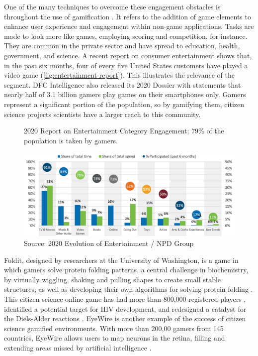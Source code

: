 One of the many techniques to overcome these engagement obstacles is throughout the use of gamification \cite{bowser2013using}. It refers to the addition of game elements to enhance user experience and engagement within non-game applications. Tasks are made to look more like games, employing scoring and competition, for instance. They are common in the private sector and have spread to education, health, government, and science. A recent report on consumer entertainment shows that, in the past six months, four of every five United States customers have played a video game (\autoref{fig:entertainment-report}). This illustrates the relevance of the segment. DFC Intelligence also released its 2020 Dossier with statements that nearly half of 3.1 billion gamers play games on their smartphones only. Gamers represent a significant portion of the population, so by gamifying them, citizen science projects scientists have a larger reach to this community.

\begin{figure}[h]
    \centering
    \caption{2020 Report on Entertainment Category Engagement; 79\% of the population is taken by gamers.}
    \includegraphics[width=\linewidth]{images/game.png}
    \caption*{Source: 2020 Evolution of Entertainment / NPD Group}
    \label{fig:entertainment-report}
\end{figure}

Foldit, designed by researchers at the University of Washington, is a game in which gamers solve protein folding patterns, a central challenge in biochemistry, by virtually wiggling, shaking and pulling shapes to create small stable structures, as well as developing their own algorithms for solving protein folding \cite{bourzac2008enlisting}. This citizen science online game has had more than 800,000 registered players \cite{foldit2021players}, identified a potential target for HIV development, and redesigned a catalyst for the Diels-Alder reactions \cite{kreitmair2019citizen}. EyeWire is another example of the success of citizen science gamified environments. With more than 200,00 gamers from 145 countries, EyeWire allows users to map neurons in the retina, filling and extending areas missed by artificial intelligence \cite{kreitmair2019citizen}.

